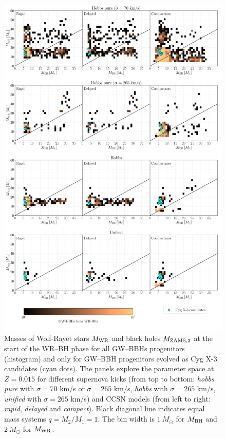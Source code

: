 \documentclass[a4paper,titlepage]{book}     	%
\newcommand{\sun}{\ensuremath{_\odot}}
\newcommand{\msun}{\ensuremath{M\sun}}
\begin{document}
\begin{figure}
	\centering
	\includegraphics[width=\textwidth]{./images/kickcompare_MWRMBH_015.pdf}	
	\caption{Masses of Wolf-Rayet stars $M_{\rm WR}$ and black holes $M_{\rm ZAMS,2}$ at the start of the WR--BH phase for all GW--BBHs progenitors (histogram) and only for GW--BBH progenitors evolved as Cyg X-3 candidates (cyan dots). The panels explore the parameter space at $Z=0.015$ for different supernova kicks (from top to bottom: \emph{hobbs pure} with $\sigma = 70$ km/s or $\sigma = 265$ km/s, \emph{hobbs} with $\sigma = 265$ km/s, \emph{unified} with $\sigma = 265$ km/s) and CCSN models (from left to right: \emph{rapid}, \emph{delayed} and \emph{compact}). Black diagonal line indicates equal mass systems $q=M_2/M_1 = 1$. The bin width is $1~\msun$ for $M_{\rm BH}$ and $2~\msun$ for $M_{\rm WR}$. }\label{fig:resultsCygX3WRBHphaseGWBBHs}
\end{figure}
\end{document}
